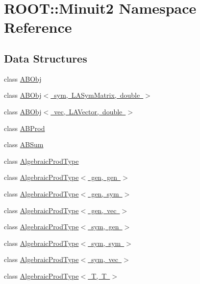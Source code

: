 \hypertarget{namespaceROOT_1_1Minuit2}{}\section{R\+O\+OT\+:\+:Minuit2 Namespace Reference}
\label{namespaceROOT_1_1Minuit2}
\subsection*{Data Structures}
\begin{DoxyCompactItemize}
\item 
class \mbox{\hyperlink{classROOT_1_1Minuit2_1_1ABObj}{A\+B\+Obj}}
\item 
class \mbox{\hyperlink{classROOT_1_1Minuit2_1_1ABObj_3_01sym_00_01LASymMatrix_00_01double_01_4}{A\+B\+Obj$<$ sym, L\+A\+Sym\+Matrix, double $>$}}
\item 
class \mbox{\hyperlink{classROOT_1_1Minuit2_1_1ABObj_3_01vec_00_01LAVector_00_01double_01_4}{A\+B\+Obj$<$ vec, L\+A\+Vector, double $>$}}
\item 
class \mbox{\hyperlink{classROOT_1_1Minuit2_1_1ABProd}{A\+B\+Prod}}
\item 
class \mbox{\hyperlink{classROOT_1_1Minuit2_1_1ABSum}{A\+B\+Sum}}
\item 
class \mbox{\hyperlink{classROOT_1_1Minuit2_1_1AlgebraicProdType}{Algebraic\+Prod\+Type}}
\item 
class \mbox{\hyperlink{classROOT_1_1Minuit2_1_1AlgebraicProdType_3_01gen_00_01gen_01_4}{Algebraic\+Prod\+Type$<$ gen, gen $>$}}
\item 
class \mbox{\hyperlink{classROOT_1_1Minuit2_1_1AlgebraicProdType_3_01gen_00_01sym_01_4}{Algebraic\+Prod\+Type$<$ gen, sym $>$}}
\item 
class \mbox{\hyperlink{classROOT_1_1Minuit2_1_1AlgebraicProdType_3_01gen_00_01vec_01_4}{Algebraic\+Prod\+Type$<$ gen, vec $>$}}
\item 
class \mbox{\hyperlink{classROOT_1_1Minuit2_1_1AlgebraicProdType_3_01sym_00_01gen_01_4}{Algebraic\+Prod\+Type$<$ sym, gen $>$}}
\item 
class \mbox{\hyperlink{classROOT_1_1Minuit2_1_1AlgebraicProdType_3_01sym_00_01sym_01_4}{Algebraic\+Prod\+Type$<$ sym, sym $>$}}
\item 
class \mbox{\hyperlink{classROOT_1_1Minuit2_1_1AlgebraicProdType_3_01sym_00_01vec_01_4}{Algebraic\+Prod\+Type$<$ sym, vec $>$}}
\item 
class \mbox{\hyperlink{classROOT_1_1Minuit2_1_1AlgebraicProdType_3_01T_00_01T_01_4}{Algebraic\+Prod\+Type$<$ T, T $>$}}

\end{DoxyCompactItemize}
